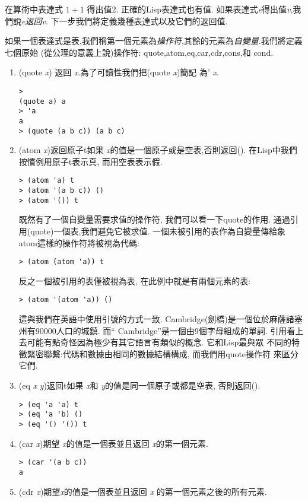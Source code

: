 \documentclass[12pt]{article}
\begin{document}
\begin{CJK}{UTF8}{bsmi}
在算術中表達式 $1 + 1$ 得出值2. 
正確的Lisp表達式也有值. 
如果表達式{\it e}得出值{\it v},我們說{\it e}{\em 返回}{\it v}. 
下一步我們將定義幾種表達式以及它們的返回值. 

如果一個表達式是表,我們稱第一個元素為{\em 操作符},其餘的元素為{\em 自變量}.我們將定義七個原始
(從公理的意義上說)操作符: 
quote,atom,eq,car,cdr,cons,和 cond. 

\begin{enumerate} 
\item 
(quote 
{\it 
x}) 
返回{\it 
x}.為了可讀性我們把(quote 
{\it 
x})簡記 
為'{\it 
x}. 

\begin{verbatim} 
> 
(quote a) a 
> 'a 
a 
> (quote (a b c)) (a b c) 
\end{verbatim} 
\item 
(atom 
{\it 
x})返回原子t如果{\it 
x}的值是一個原子或是空表,否則返回(). 
在Lisp中我們 
按慣例用原子t表示真, 
而用空表表示假. 
\begin{verbatim} 
> (atom 'a) t 
> (atom '(a b c)) () 
> (atom '()) t 
\end{verbatim} 
既然有了一個自變量需要求值的操作符, 
我們可以看一下quote的作用. 
通過引 
用(quote)一個表,我們避免它被求值. 
一個未被引用的表作為自變量傳給象 
atom這樣的操作符將被視為代碼: 
\begin{verbatim} 
> (atom (atom 'a)) t 
\end{verbatim} 
反之一個被引用的表僅被視為表, 
在此例中就是有兩個元素的表: 
\begin{verbatim} 
> (atom '(atom 'a)) () 
\end{verbatim} 
這與我們在英語中使用引號的方式一致. 
{\rm 
Cambridge}(劍橋)是一個位於麻薩諸塞 
州有90000人口的城鎮. 
而``{\rm 
Cambridge}''是一個由9個字母組成的單詞. 
引用看上去可能有點奇怪因為極少有其它語言有類似的概念. 
它和Lisp最與眾 
不同的特徵緊密聯繫:代碼和數據由相同的數據結構構成, 
而我們用quote操作符 
來區分它們. 
\item 
(eq 
{\it 
x} 
{\it 
y})返回t如果{\it 
x}和{\it 
y}的值是同一個原子或都是空表, 
否則返回(). 
\begin{verbatim} 
> (eq 'a 'a) t 
> (eq 'a 'b) () 
> (eq '() '()) t 
\end{verbatim} 
\item 
(car 
{\it 
x})期望{\it 
x}的值是一個表並且返回{\it 
x}的第一個元素. 
\begin{verbatim} 
> (car '(a b c)) 
a 
\end{verbatim} 
\item 
(cdr {\it x})期望{\it x}的值是一個表並且返回 {\it x} 的第一個元素之後的所有元素. 

\end{enumerate}
\end{CJK}
\end{document}
